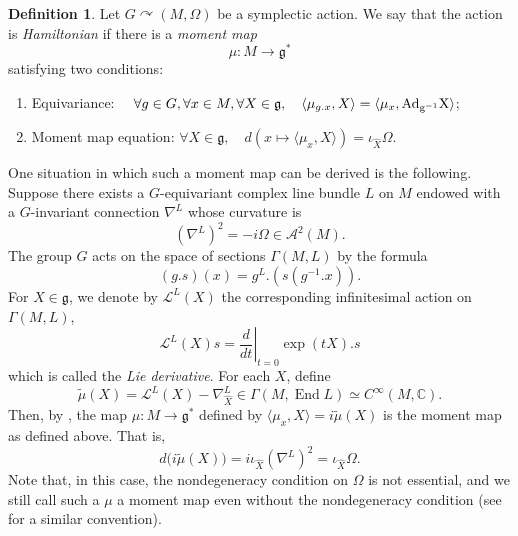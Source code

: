 \documentclass[12pt,reqno,a4paper]{amsart}
\numberwithin{equation}{section}
\DeclareMathOperator{\End}{End}
\theoremstyle{definition}
\newtheorem{definition}{Definition}
\theoremstyle{remark}
\begin{document}
\begin{definition}
Let $G\curvearrowright (M,\Omega)$ be a symplectic action. We say that the action is \textit{Hamiltonian} if there is a \textit{moment map}
\begin{equation*}
\mu : M \rightarrow \mathfrak{g}^*
\end{equation*}
satisfying two conditions:
\begin{enumerate}
    \item Equivariance: $\quad \forall g\in G, \forall x\in M, \forall X\in \mathfrak{g},\quad \langle \mu_{g.x}, X\rangle=\langle \mu_{x}, \rm{Ad}_{g^{-1}}X\rangle$;
    \item Moment map equation: $\forall X\in \mathfrak{g},\quad d(x\mapsto \langle \mu_x,X\rangle)=\iota_{\widehat{X}}\Omega$.
\end{enumerate}
\end{definition}
One situation in which such a moment map can be derived is the following. Suppose there exists a $G$-equivariant complex line bundle $L$ on $M$ endowed with a $G$-invariant connection $\nabla^{L}$ whose curvature is
\begin{equation*}
\left(\nabla^L \right)^2=-i\Omega \in \mathcal{A}^2(M).
\end{equation*}
The group $G$ acts on the space of sections $\Gamma(M,L)$ by the formula
\begin{equation}\label{pullback}
(g.s)(x)=g^{L}.(s(g^{-1}.x)).
\end{equation}
For $X\in\mathfrak{g}$, we denote by $\mathcal{L}^L(X)$ the corresponding infinitesimal action on $\Gamma(M,L)$,
\begin{equation*}
\mathcal{L}^L(X)s=\left.\frac{d}{dt}\right|_{t=0}\exp(tX).s
\end{equation*}
which is called the \textit{Lie derivative}. For each $X$, define
\begin{equation}\label{moment}
\widetilde{\mu}(X)=\mathcal{L}^L(X)-\nabla^L_{\widehat{X}} \in \Gamma(M,\End{L})\simeq C^\infty(M,\mathbb{C}).
\end{equation}
Then, by \cite[Example 7.9]{BerlineGetzlerVergne2004}, the map $\mu : M\rightarrow \mathfrak{g}^*$ defined by $\langle \mu_x,X\rangle=i\widetilde{\mu}(X)$ is the moment map as defined above. That is,
\begin{equation*}
d\bigl(i\widetilde{\mu}(X)\bigr)=i\iota_{\widehat{X}}\left(\nabla^L \right)^2=\iota_{\widehat{X}}\Omega.
\end{equation*}
Note that, in this case, the nondegeneracy condition on $\Omega$ is not essential, and we still call such a $\mu$ a moment map even without the nondegeneracy condition (see \cite{dervan2023universal} for a similar convention).
\end{document}
